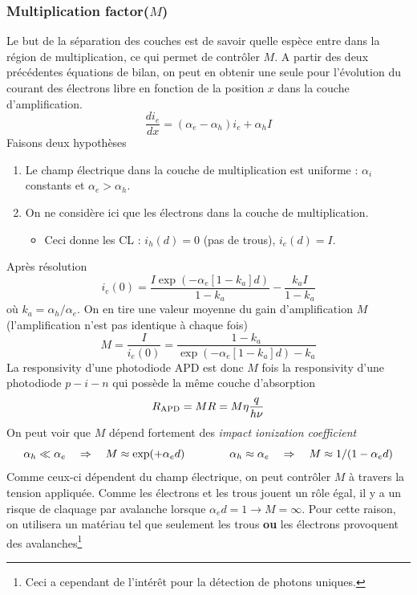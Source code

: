 \subsubsection{Multiplication factor($M$)}
Le but de la séparation des couches est de savoir quelle espèce entre dans la région de 
multiplication, ce qui permet de contrôler $M$. A partir des deux précédentes équations de bilan, 
on peut en obtenir une seule pour l'évolution du courant des électrons libre en fonction de la
position $x$ dans la couche d'amplification.
\begin{equation}
\frac{{d{i_e}}}{{dx}} = ({\alpha _e} - {\alpha _h}){i_e} + {\alpha _h}I
\end{equation}
Faisons deux hypothèses
\begin{enumerate}
\item Le champ électrique dans la couche de multiplication est uniforme : $\alpha_i$ constants et
$\alpha_e>\alpha_h$.
\item On ne considère ici que les électrons dans la couche de multiplication. 
\begin{itemize}
\item Ceci donne les CL : $i_h(d)=0$ (pas de trous), $i_e(d)=I$.
\end{itemize}
\end{enumerate}
Après résolution
\begin{equation}
{i_e}(0) = \frac{{I\exp ( - {\alpha _e}[1 - {k_a}]d)}}{{1 - {k_a}}} - \frac{{{k_a}I}}{{1 - {k_a}}}
\end{equation}
où $k_a = \alpha_h/\alpha_e$. On en tire une valeur moyenne du gain d'amplification $M$
 (l'amplification n'est pas identique à chaque fois)
\begin{equation}
M = \frac{I}{{{i_e}(0)}} = \frac{{1 - {k_a}}}{{\exp ( - {\alpha _e}[1 - {k_a}]d) - {k_a}}}
\end{equation}
La responsivity d'une photodiode APD est donc $M$ fois la responsivity d'une photodiode $p-i-n$ 
qui possède la même couche d'absorption
\begin{equation}
{R_{{\rm{APD}}}} = MR = M\eta \frac{q}{{h\nu }}
\end{equation}
On peut voir que $M$ dépend fortement des \textit{impact ionization coefficient}
\begin{equation}
\alpha_h\ll \alpha_e\quad\Rightarrow\quad M{\rm{ }} \approx {\rm{ exp( + }}{\alpha _e}d)\qquad\qquad
\alpha_h\approx \alpha_e\quad\Rightarrow\quad M{\rm{ }} \approx {\rm{ }}1/(1 - {\alpha _e}d)
\end{equation}
Comme ceux-ci dépendent du champ électrique, on peut contrôler $M$ à travers la tension appliquée.
Comme les électrons et les trous jouent un rôle égal, il y a un risque de claquage par avalanche 
lorsque $\alpha_ed=1 \to M=\infty$. Pour cette raison, on utilisera un matériau tel que seulement
les trous \textbf{ou} les électrons provoquent des avalanches\footnote{Ceci a cependant de 
l'intérêt pour la détection de photons uniques.}

